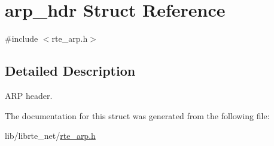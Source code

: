 \hypertarget{structarp__hdr}{}\section{arp\+\_\+hdr Struct Reference}
\label{structarp__hdr}


{\ttfamily \#include $<$rte\+\_\+arp.\+h$>$}



\subsection{Detailed Description}
A\+R\+P header. 

The documentation for this struct was generated from the following file\+:\begin{DoxyCompactItemize}
\item 
lib/librte\+\_\+net/\hyperlink{rte__arp_8h}{rte\+\_\+arp.\+h}\end{DoxyCompactItemize}

